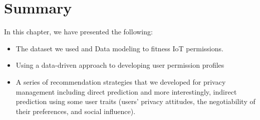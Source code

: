 

\section{Summary}
In this chapter, we have presented the following:

\begin{itemize}
	\item The dataset we used and Data modeling to fitness IoT permissions.
	\item Using a data-driven approach to developing user permission profiles
	\item A series of recommendation strategies that we developed for privacy management including direct prediction and more interestingly, indirect prediction using some user traits (users' privacy attitudes, the negotiability of their preferences, and social influence). 
\end{itemize}

